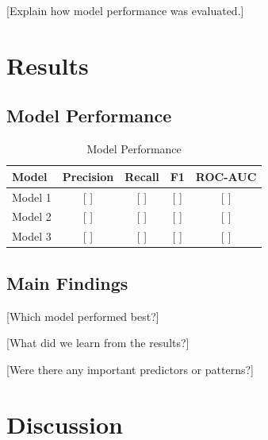 \documentclass[conference]{IEEEtran}
\begin{document}

[Explain how model performance was evaluated.]


\section{Results}


\subsection{Model Performance}

\begin{table}[ht]
\centering
\caption{Model Performance}
\begin{tabular}{lcccc}
\toprule
Model & Precision & Recall & F1 & ROC-AUC \\
\midrule
Model 1 & [ ] & [ ] & [ ] & [ ] \\
Model 2 & [ ] & [ ] & [ ] & [ ] \\
Model 3 & [ ] & [ ] & [ ] & [ ] \\
\bottomrule
\end{tabular}
\end{table}


\subsection{Main Findings}

[Which model performed best?]

[What did we learn from the results?]

[Were there any important predictors or patterns?]


\section{Discussion}

\end{document}
